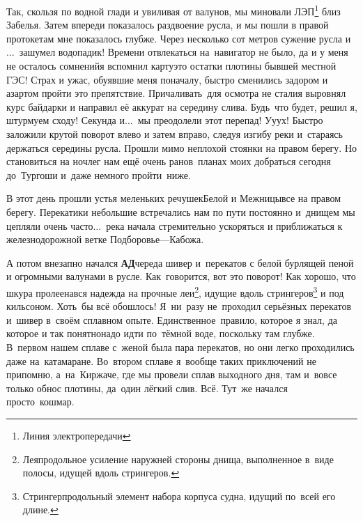 Так, скользя по водной глади и увиливая от валунов, мы миновали ЛЭП\footnote[1]{Линия электропередачи} близ Забелья. Затем впереди показалось раздвоение русла, и мы пошли в правой протоке\mdash там мне показалось глубже. Через несколько сот метров сужение русла и$\ldots$~зашумел водопадик! Времени отвлекаться на~навигатор не было, да и у меня не осталось сомнений\mdash я вспомнил карту\mdash это остатки плотины бывшей местной ГЭС! Страх и ужас, обуявшие меня поначалу, быстро сменились задором и азартом пройти это препятствие. Причаливать~для осмотра не стали\mdash я выровнял курс байдарки и направил её аккурат на середину слива. Будь~что будет, решил я, штурмуем сходу! Секунда и$\ldots$~мы преодолели этот перепад! У\sdash у\sdash ух! Быстро заложили крутой поворот влево и затем вправо, следуя изгибу реки и~стараясь держаться середины русла. Прошли мимо неплохой стоянки на правом берегу. Но становиться на ночлег нам ещё очень рано\mdash в~планах моих добраться сегодня до~Тургоши и~даже немного пройти~ниже. 

В этот день прошли устья меленьких речушек\mdash Белой и Межницы\mdash все на правом берегу. Перекатики небольшие встречались нам по пути постоянно и~днищем мы цепляли очень часто$\ldots$~река начала стремительно ускоряться и приближаться к железнодорожной ветке Подборовье\thinspace\nobreakdash---\thinspace Кабожа.

{
\renewcommand*{\thefootnote}{\arabic{footnote}}
А потом внезапно начался {\bfseries{АД}}\mdash череда шивер и~перекатов с белой бурлящей пеной и огромными валунами в русле. Как~говорится, вот это поворот! Как хорошо, что шкура пролеена\mdash вся надежда на прочные леи\footnote{Лея\mdash продольное усиление наружней стороны днища, выполненное в~виде полосы, идущей вдоль стрингеров.}, идущие вдоль стрингеров\footnote{Стрингер\mdash продольный элемент набора корпуса судна, идущий по~всей его длине\cite{МорскойСправочник}.} и под кильсоном. Хоть~бы всё обошлось! Я~ни~разу не~проходил серьёзных перекатов и~шивер в~своём сплавном опыте. Единственное~правило, которое я знал, да которое и так понятно\mdash надо идти по~тёмной воде, поскольку там глубже. В~первом нашем сплаве с~женой была пара перекатов, но они легко проходились даже на~катамаране. Во~втором сплаве я~вообще таких приключений не припомню, а~на~Киржаче, где мы провели сплав выходного дня, там и~вовсе только обнос плотины, да~один лёгкий слив. Всё. Тут~же начался просто~кошмар.
}

